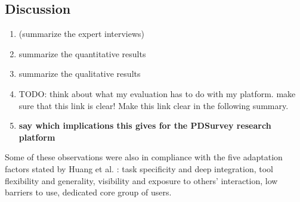 

	







\subsection{Discussion}


	\begin{enumerate}
	\item (summarize the expert interviews)
	\item summarize the quantitative results
	\item summarize the qualitative results 
	\item TODO: think about what my evaluation has to do with my platform. make sure that this link is clear! Make this link clear in the following summary.
	\item \textbf{say which implications this gives for the PDSurvey research platform}
	\end{enumerate}


	Some of these observations were also in compliance with the five adaptation factors stated by Huang et al. \cite{Huang2004}: task specificity and deep integration, tool flexibility and generality, visibility and exposure to others' interaction, low barriers to use, dedicated core group of users.

